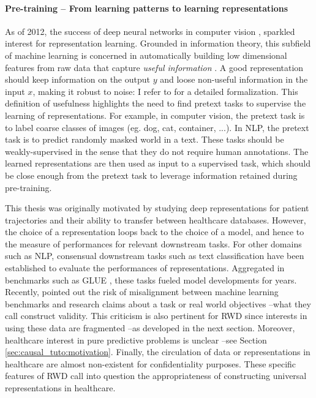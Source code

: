 \documentclass[french,12pt,twoside,a4paper]{book}
\begin{document}
\begin{background_box_left}

  \paragraph{Pre-training -- From learning patterns to learning representations}
  As of 2012, the success of deep neural networks in computer vision
  \citep{krizhevsky2012imagenet}, sparkled interest for representation learning.
  Grounded in information theory, this subfield of machine learning is concerned
  in automatically building low dimensional features from raw data that capture
  \emph{useful information} \citep{bengio2013representation}. A good
  representation should keep information on the output $y$ and loose non-useful
  information in the input $x$, making it robust to noise: I refer to
  \cite{achille2018emergence} for a detailed formalization. This definition of
  usefulness highlights the need to find pretext tasks to supervise the learning
  of representations. For example, in computer vision, the pretext task is to
  label coarse classes of images (eg. dog, cat, container, ...). In NLP, the
  pretext task is to predict randomly masked world in a text. These tasks should
  be weakly-supervised in the sense that they do not require human annotations.
  The learned representations are then used as input to a supervised task, which
  should be close enough from the pretext task to leverage information retained
  during pre-training.

  This thesis was originally motivated by studying deep representations for
  patient trajectories and their ability to transfer between healthcare
  databases. However, the choice of a representation loops back to the choice
  of a model, and hence to the measure of performances for relevant downstream
  tasks. For other domains such as NLP, consensual downstream tasks such as text
  classification have been established to evaluate the performances of
  representations. Aggregated in benchmarks such as GLUE \citep{wang2018glue},
  these tasks fueled model developments for years. Recently, \cite{raji2021ai}
  pointed out the risk of misalignment between machine learning benchmarks and
  research claims about a task or real world objectives --what they call
  construct validity. This criticism is also pertinent for RWD since interests
  in using these data are fragmented --as developed in the next section.
  Moreover, healthcare interest in pure predictive problems is unclear --see
  Section \ref{sec:causal_tuto:motivation}. Finally, the circulation of data or
  representations in healthcare are almost non-existent for confidentiality
  purposes. These specific features of RWD call into question the
  appropriateness of constructing universal representations in healthcare.


\end{background_box_left}
\end{document}
